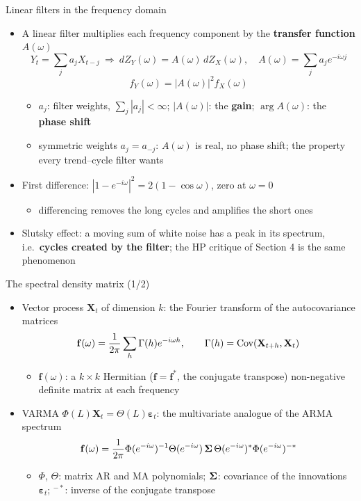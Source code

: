 \begin{frame}{Linear filters in the frequency domain}
\itemsize{\small}
\begin{itemize}
    \item A linear filter multiplies each frequency component by the \textbf{transfer function} $A(\omega)$
    \[ Y_t = \sum_j a_jX_{t-j} \ \Rightarrow\ dZ_Y(\omega) = A(\omega)\,dZ_X(\omega), \quad A(\omega) = \sum_j a_je^{-i\omega j} \]
    \[ f_Y(\omega) = |A(\omega)|^2f_X(\omega) \]
    \begin{itemize}
        \item $a_j$: filter weights, $\sum_j|a_j| < \infty$; $|A(\omega)|$: the \textbf{gain}; $\arg A(\omega)$: the \textbf{phase shift}
        \item symmetric weights $a_j = a_{-j}$: $A(\omega)$ is real, no phase shift; the property every trend--cycle filter wants
    \end{itemize}
    \item First difference: $|1 - e^{-i\omega}|^2 = 2(1 - \cos\omega)$, zero at $\omega = 0$
    \begin{itemize}
        \item differencing removes the long cycles and amplifies the short ones
    \end{itemize}
    \item Slutsky effect: a moving sum of white noise has a peak in its spectrum, i.e.\ \textbf{cycles created by the filter}; the HP critique of Section 4 is the same phenomenon
\end{itemize}
\end{frame}

\begin{frame}{The spectral density matrix (1/2)}
\itemsize{\small}
\begin{itemize}
    \item Vector process $\mathbf X_t$ of dimension $k$: the Fourier transform of the autocovariance matrices
    \[ \mathbf f(\omega) = \frac{1}{2\pi}\sum_h\Gamma(h)e^{-i\omega h}, \qquad \Gamma(h) = \text{Cov}(\mathbf X_{t+h}, \mathbf X_t) \]
    \begin{itemize}
        \item $\mathbf f(\omega)$: a $k \times k$ Hermitian ($\mathbf f = \mathbf f^*$, the conjugate transpose) non-negative definite matrix at each frequency
    \end{itemize}
    \item VARMA $\Phi(L)\mathbf X_t = \Theta(L)\boldsymbol\varepsilon_t$: the multivariate analogue of the ARMA spectrum
    \[ \mathbf f(\omega) = \frac{1}{2\pi}\Phi(e^{-i\omega})^{-1}\Theta(e^{-i\omega})\,\boldsymbol{\Sigma}\,\Theta(e^{-i\omega})^*\Phi(e^{-i\omega})^{-*} \]
    \begin{itemize}
        \item $\Phi$, $\Theta$: matrix AR and MA polynomials; $\boldsymbol{\Sigma}$: covariance of the innovations $\boldsymbol\varepsilon_t$; $^{-*}$: inverse of the conjugate transpose
    \end{itemize}
\end{itemize}
\end{frame}

